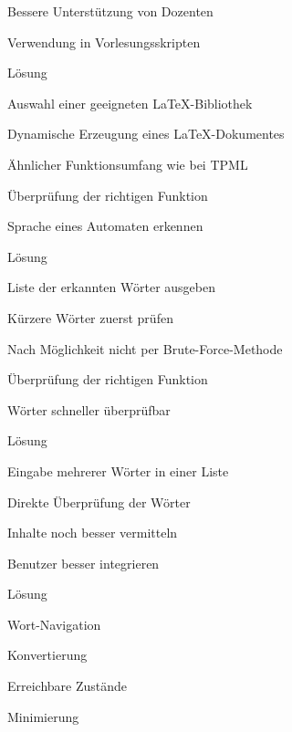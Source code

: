 {
    \begin{itemgroup}{}
	\item Bessere Unterstützung von Dozenten
	\item Verwendung in Vorlesungsskripten
    \end{itemgroup}

    \begin{itemgroup}{Lösung}
	\item Auswahl einer geeigneten \LaTeX-Bibliothek
	\item Dynamische Erzeugung eines \LaTeX-Dokumentes
	\item Ähnlicher Funktionsumfang wie bei TPML
	\end{itemgroup}
    
    \vfill{}
}


{
    \begin{itemgroup}{}
	\item Überprüfung der richtigen Funktion
	\item Sprache eines Automaten erkennen 
    \end{itemgroup}

    \begin{itemgroup}{Lösung}
	\item Liste der erkannten Wörter ausgeben
	\item Kürzere Wörter zuerst prüfen
	\item Nach Möglichkeit nicht per Brute-Force-Methode
	\end{itemgroup}
    
    \vfill{}
}


{
    \begin{itemgroup}{}
	\item Überprüfung der richtigen Funktion
	\item Wörter schneller überprüfbar
    \end{itemgroup}

    \begin{itemgroup}{Lösung}
	\item Eingabe mehrerer Wörter in einer Liste
	\item Direkte Überprüfung der Wörter
	\end{itemgroup}
    
    \vfill{}
}


{
    \begin{itemgroup}{}
	\item Inhalte noch besser vermitteln
	\item Benutzer besser integrieren
    \end{itemgroup}

    \begin{itemgroup}{Lösung}
	\item Wort-Navigation
	\item Konvertierung
	\item Erreichbare Zustände
	\item Minimierung
	\end{itemgroup}
    
    \vfill{}
}


